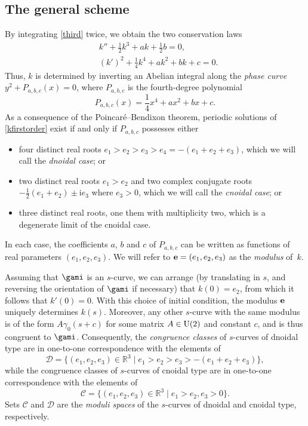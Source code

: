 \documentclass[pdftex]{sigma}
\newcommand\kk{k} %
\def\ri{\mathrm{i}}
\def\gam{\gamma} %
\def\R{\mathbb R}
\newcommand\be{{\bf e}}
\numberwithin{equation}{section}
\begin{document}
\subsection{The general scheme} By integrating \eqref{third} twice, we obtain the two conservation laws
\begin{subequations}\label{second}
\begin{align}
&\kk''+\frac{1}{2}\kk^3+a\kk+\frac12{b}=0, \label{ksecond}\\
&(\kk')^2+\frac{1}{4}\kk^4+a\kk^2+b\kk +c=0. \label{kfirstorder}
\end{align}
\end{subequations}
Thus, $\kk$ is determined by inverting an Abelian integral along the {\it phase curve} $y^2 + P_{a,b,c}(x)=0$, where $P_{a,b,c}$ is the fourth-degree polynomial
\begin{equation*}%
P_{a,b,c}(x)=\frac14 x^4+ax^2+bx+c.
\end{equation*}
As a consequence of the Poincar\'e--Bendixon theorem,
periodic solutions of \eqref{kfirstorder} exist if and only if $P_{a,b,c}$ possesses either
\begin{itemize}\itemsep=0pt
\item four distinct real roots $e_1>e_2>e_3>e_4=-(e_1+e_2+e_3)$, which we will call the {\it dnoidal case}; or
\item two distinct real roots $e_1>e_2$ and two complex conjugate roots $-\frac{1}{2}(e_1+e_2)\pm \ri e_3$ where $e_3>0$, which we will call the {\it cnoidal case}; or
\item three distinct real roots, one them with multiplicity two, which is a degenerate limit of the cnoidal case.
\end{itemize}
In each case, the coefficients $a$, $b$ and $c$ of $P_{a,b,c}$ can be written as functions of real parameters $(e_1, e_2, e_3)$. We will refer to $\be=(e_1, e_2, e_3)$ as the {\it modulus} of~$\kk$.

Assuming that $\gami$ is an $s$-curve, we can arrange (by translating in $s$, and reversing the orientation of $\gami$ if necessary)
that $\kk(0)=e_2$, from which it follows that $\kk'(0)=0$.
With this choice of initial condition, the modulus $\be$ uniquely determines $\kk(s)$.
Moreover, any other $s$-curve with the same modulus is of the form $A \gam_0(s+c)$ for some matrix $A\in {\rm U}(2)$ and constant $c$, and is thus {congruent} to $\gami$.
Consequently, the {\em congruence classes} of $s$-curves of dnoidal type are in one-to-one correspondence with the elements of
\[{\mathcal D}=\bigl\{(e_1,e_2,e_3)\in \R^3\mid e_1>e_2>e_3>-(e_1+e_2+e_3)\bigr\},\]
while the congruence classes of $s$-curves of cnoidal type are in one-to-one correspondence with the elements of{\samepage
\[{\mathcal C}=\bigl\{(e_1,e_2,e_3)\in \R^3\mid e_1>e_2, e_3>0\bigr\}.\]
Sets ${\mathcal C}$ and ${\mathcal D}$ are the {\it moduli spaces} of the $s$-curves of dnoidal and cnoidal type, respectively.}
\end{document}
